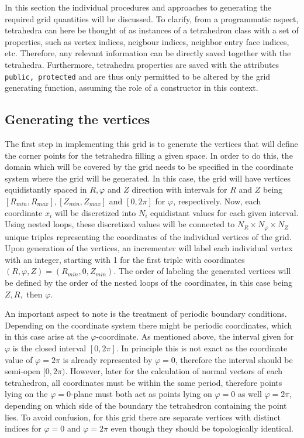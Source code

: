 \documentclass[./main.tex]{subfiles}
\begin{document}
In this section the individual procedures and approaches to generating the required grid quantities will be discussed. To clarify, from a programmatic aspect, tetrahedra can here be thought of as instances of a tetrahedron class with a set of properties, such as vertex indices, neigbour indices, neighbor entry face indices, etc. Therefore, any relevant information can be directly saved together with the tetrahedra. Furthermore, tetrahedra properties are saved with the attributes \texttt{public, protected} and are thus only permitted to be altered by the grid generating function, assuming the role of a constructor in this context.


\subsection{Generating the vertices}
The first step in implementing this grid is to generate the vertices that will define the corner points for the tetrahedra filling a given space. In order to do this, the domain which will be covered by the grid needs to be specified in the coordinate system where the grid will be generated. In this case, the grid will have vertices equidistantly spaced in $R,\varphi$ and $Z$ direction with intervals for $R$ and $Z$ being $[R_{min},R_{max}], [Z_{min},Z_{max}]$ and $[0,2\pi]$ for $\varphi$, respectively. Now, each coordinate $x_i$ will be discretized into $N_i$ equidistant values for each given interval. Using nested loops, these discretized values will be connected to $N_R\times N_\varphi\times N_Z$ unique triples representing the coordinates of the individual vertices of the grid. Upon generation of the vertices, an incrementer will label each individual vertex with an integer, starting with 1 for the first triple with coordinates$(R,\varphi,Z) = (R_{min},0,Z_{min})$. The order of labeling the generated vertices will be defined by the order of the nested loops of the coordinates, in this case being $Z,R,$ then $\varphi$. 

An important aspect to note is the treatment of periodic boundary conditions. Depending on the coordinate system there might be periodic coordinates, which in this case arise at the $\varphi$-coordinate. As mentioned above, the interval given for $\varphi$ is the closed interval $[0,2\pi]$. In principle this is not exact as the coordinate value of $\varphi=2\pi$ is already represented by $\varphi=0$, therefore the interval should be semi-open $[0,2\pi)$. However, later for the calculation of normal vectors of each tetrahedron, all coordinates must be within the same period, therefore points lying on the $\varphi=0$-plane must both act as points lying on $\varphi=0$ as well $\varphi=2\pi$, depending on which side of the boundary the tetrahedron containing the point lies. To avoid confusion, for this grid there are separate vertices with distinct indices for $\varphi=0$ and $\varphi=2\pi$ even though they should be topologically identical. 
\end{document}
